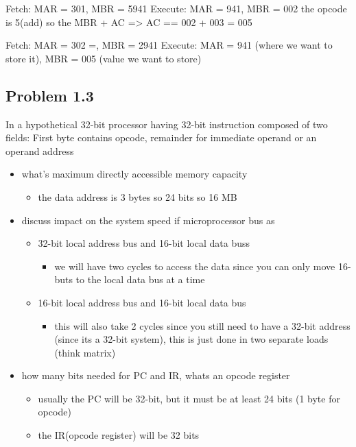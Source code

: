 \documentclass[12pt]{article}
\begin{document}
Fetch: MAR = 301, MBR = 5941
Execute: MAR = 941, MBR = 002
the opcode is  5(add) so the MBR + AC => AC == 002 + 003 = 005

Fetch: MAR = 302 =, MBR = 2941
Execute: MAR = 941 (where we want to store it), MBR = 005 (value we want to store)

\subsection*{Problem 1.3}
In a hypothetical 32-bit processor having 32-bit instruction composed of two fields: First byte contains opcode, remainder for immediate operand or an operand address

\begin{itemize}
    \item what's maximum directly accessible memory capacity
    \begin{itemize}
        \item the data address is 3 bytes so 24 bits so 16 MB
    \end{itemize}
    \item discuss impact on the system speed if microprocessor bus as
    \begin{itemize}
        \item 32-bit local address bus and 16-bit local data buss
        \begin{itemize}
            \item we will have two cycles to access the data since you can only move 16-buts to the local data bus at a time
        \end{itemize}
        \item 16-bit local address bus and 16-bit local data bus
        \begin{itemize}
            \item this will also take 2 cycles since you still need to have a 32-bit address (since its a 32-bit system), this is just done in two separate loads (think matrix)
        \end{itemize}
    \end{itemize}
    \item how many bits needed for PC and IR, whats an opcode register
    \begin{itemize}
        \item usually the PC will be 32-bit, but it must be at least 24 bits (1 byte for opcode)
        \item the IR(opcode register) will be 32 bits
    \end{itemize}
\end{itemize}
\end{document}
